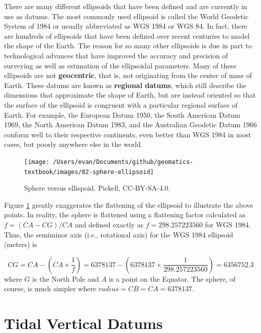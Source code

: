 \documentclass[
]{book}
\begin{document}
There are many different ellipsoids that have been defined and are currently in use as datums. The most commonly used ellipsoid is called the World Geodetic System of 1984 or usually abbreviated as WGS 1984 or WGS 84. In fact, there are hundreds of ellipsoids that have been defined over recent centuries to model the shape of the Earth. The reason for so many other ellipsoids is due in part to technological advances that have improved the accuracy and precision of surveying as well as estimation of the ellipsoidal parameters. Many of these ellipsoids are not \textbf{geocentric}, that is, not originating from the center of mass of Earth. These datums are known as \textbf{regional datums}, which still describe the dimensions that approximate the shape of Earth, but are instead oriented so that the surface of the ellipsoid is congruent with a particular regional surface of Earth. For example, the European Datum 1950, the South American Datum 1969, the North American Datum 1983, and the Australian Geodetic Datum 1966 conform well to their respective continents, even better than WGS 1984 in most cases, but poorly anywhere else in the world.

\begin{figure}
\texttt{[image: /Users/evan/Documents/github/geomatics-textbook/images/02-sphere-ellipsoid]} \caption{Sphere versus ellispoid. Pickell, CC-BY-SA-4.0.}\label{fig:2-sphere-ellipsoid}
\end{figure}

Figure \ref{fig:2-sphere-ellipsoid} greatly exaggerates the flattening of the ellipsoid to illustrate the above points. In reality, the sphere is flattened using a flattening factor calculated as \(f=(CA-CG)/CA\) and defined exactly as \(f=298.257223560\) for WGS 1984. Thus, the semiminor axis (i.e., rotational axis) for the WGS 1984 ellipsoid (meters) is

\[
CG=CA-(CA×\frac{1}{f})=6378137-(6378137×\frac{1}{298.257223560})=6356752.3
\]
where \(G\) is the North Pole and \(A\) is a point on the Equator. The sphere, of course, is much simpler where \(radius=CB=CA=6378137\).

\hypertarget{tidal-vertical-datums}{%
\section{Tidal Vertical Datums}\label{tidal-vertical-datums}}
\end{document}
